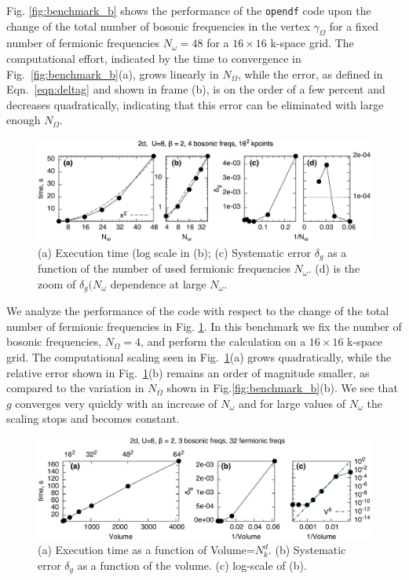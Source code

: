 \documentclass[3p,times,procedia]{elsarticle}
\begin{document}
Fig. \ref{fig:benchmark_b} shows the performance of the \texttt{opendf} code upon the change of the total number of bosonic frequencies in the vertex $\gamma_{\Omega}$ for a fixed number of fermionic frequencies $N_{\omega}=48$ for a $16 \times 16$ k-space grid. The computational effort, indicated by the time to convergence in Fig.~\ref{fig:benchmark_b}(a), grows linearly in $N_{\Omega}$, while the error, as defined in Eqn.~\ref{eqn:deltag} and shown in frame (b), is on the order of a few percent and decreases quadratically, indicating that this error can be eliminated with large enough $N_{\Omega}$.

\begin{figure}[ht]
\includegraphics[width=1.0\columnwidth]{time_ffreqs.pdf}
\caption{(a) Execution time (log scale in (b); (c) Systematic error $\delta_g$ as a function of the number of used fermionic frequencies $N_{\omega}$. (d) is the zoom of $\delta_g(N_{\omega}$ dependence at large $N_{\omega}$.}
\label{fig:benchmark_f}
\end{figure}

We analyze the performance of the code with respect to the change of the total number of fermionic frequencies in Fig. \ref{fig:benchmark_f}.  In this benchmark we fix the number of bosonic frequencies, $N_{\Omega}=4$, and perform the calculation on a $16\times16$ k-space grid. The computational scaling seen in Fig.~\ref{fig:benchmark_f}(a)  grows quadratically, while the relative error shown in Fig.~\ref{fig:benchmark_f}(b) remains an order of magnitude smaller, as compared to the variation in $N_{\Omega}$ shown in Fig.\ref{fig:benchmark_b}(b). We see that $g$ converges very quickly with an increase of $N_{\omega}$ and for large values of $N_{\omega}$ the scaling stops and becomes constant.

\begin{figure}[ht]
\includegraphics[width=1.0\columnwidth]{time_kpts.pdf}
\caption{(a) Execution time as a function of Volume=$N_k^d$. (b) Systematic error $\delta_g$ as a function of the volume. (c) log-scale of (b).}
\label{fig:benchmark_kpts}
\end{figure}
\end{document}
